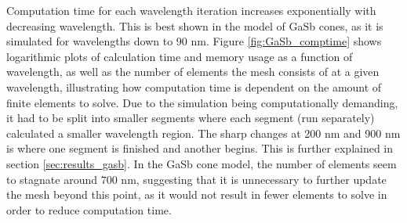 Computation time for each wavelength iteration increases exponentially with decreasing wavelength. This is best shown in the model of GaSb cones, as it is simulated for wavelengths down to 90 nm. Figure \ref{fig:GaSb_comptime} shows logarithmic plots of calculation time and memory usage as a function of wavelength, as well as the number of elements the mesh consists of at a given wavelength, illustrating how computation time is dependent on the amount of finite elements to solve. Due to the simulation being computationally demanding, it had to be split into smaller segments where each segment (run separately) calculated a smaller wavelength region. The sharp changes at 200 nm and 900 nm is where one segment is finished and another begins. This is further explained in section \ref{sec:results_gasb}. In the GaSb cone model, the number of elements seem to stagnate around 700 nm, suggesting that it is unnecessary to further update the mesh beyond this point, as it would not result in fewer elements to solve in order to reduce computation time.






